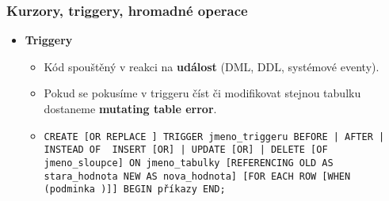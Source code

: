 \subsubsection{Kurzory, triggery, hromadné operace}
\begin{itemize}
\item\textbf{Triggery}
\begin{itemize}
\item Kód spouštěný v reakci na \textbf{událost} (DML, DDL, systémové eventy).
\item Pokud se pokusíme v triggeru číst či modifikovat stejnou tabulku dostaneme \textbf{mutating table error}.
\item \texttt{CREATE [OR REPLACE ] TRIGGER jmeno\_triggeru {BEFORE | AFTER | INSTEAD OF } {INSERT [OR] | UPDATE [OR] | DELETE} [OF jmeno\_sloupce] ON jmeno\_tabulky [REFERENCING OLD AS stara\_hodnota NEW AS nova\_hodnota] [FOR EACH ROW [WHEN (podminka )]] BEGIN příkazy END;}
\end{itemize}
\end{itemize}



